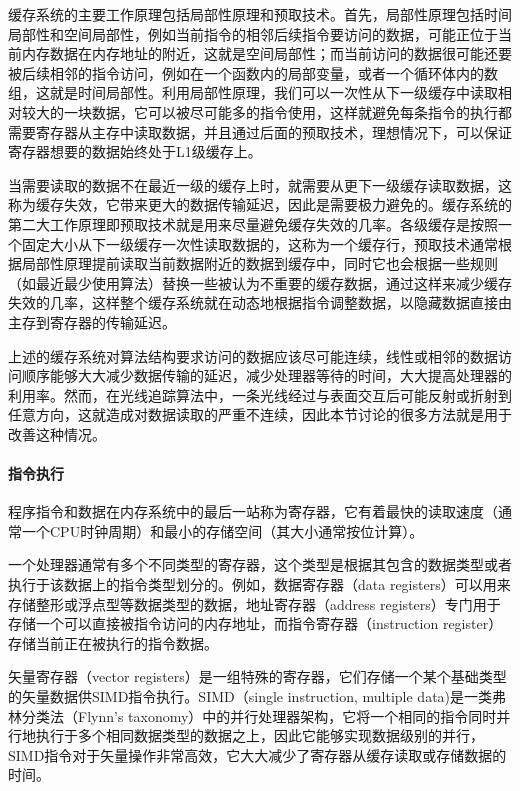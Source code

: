 缓存系统的主要工作原理包括局部性原理和预取技术。首先，局部性原理包括时间局部性和空间局部性，例如当前指令的相邻后续指令要访问的数据，可能正位于当前内存数据在内存地址的附近，这就是空间局部性；而当前访问的数据很可能还要被后续相邻的指令访问，例如在一个函数内的局部变量，或者一个循环体内的数组，这就是时间局部性。利用局部性原理，我们可以一次性从下一级缓存中读取相对较大的一块数据，它可以被尽可能多的指令使用，这样就避免每条指令的执行都需要寄存器从主存中读取数据，并且通过后面的预取技术，理想情况下，可以保证寄存器想要的数据始终处于L1级缓存上。

当需要读取的数据不在最近一级的缓存上时，就需要从更下一级缓存读取数据，这称为缓存失效，它带来更大的数据传输延迟，因此是需要极力避免的。缓存系统的第二大工作原理即预取技术就是用来尽量避免缓存失效的几率。各级缓存是按照一个固定大小从下一级缓存一次性读取数据的，这称为一个缓存行，预取技术通常根据局部性原理提前读取当前数据附近的数据到缓存中，同时它也会根据一些规则（如最近最少使用算法）替换一些被认为不重要的缓存数据，通过这样来减少缓存失效的几率，这样整个缓存系统就在动态地根据指令调整数据，以隐藏数据直接由主存到寄存器的传输延迟。

上述的缓存系统对算法结构要求访问的数据应该尽可能连续，线性或相邻的数据访问顺序能够大大减少数据传输的延迟，减少处理器等待的时间，大大提高处理器的利用率。然而，在光线追踪算法中，一条光线经过与表面交互后可能反射或折射到任意方向，这就造成对数据读取的严重不连续，因此本节讨论的很多方法就是用于改善这种情况。





\paragraph{指令执行}
程序指令和数据在内存系统中的最后一站称为寄存器，它有着最快的读取速度（通常一个CPU时钟周期）和最小的存储空间（其大小通常按位计算）。

一个处理器通常有多个不同类型的寄存器，这个类型是根据其包含的数据类型或者执行于该数据上的指令类型划分的。例如，数据寄存器（data registers）可以用来存储整形或浮点型等数据类型的数据，地址寄存器（address registers）专门用于存储一个可以直接被指令访问的内存地址，而指令寄存器（instruction register）存储当前正在被执行的指令数据。

矢量寄存器（vector registers）是一组特殊的寄存器，它们存储一个某个基础类型的矢量数据供SIMD指令执行。SIMD（single instruction, multiple data)是一类弗林分类法（Flynn's taxonomy）中的并行处理器架构，它将一个相同的指令同时并行地执行于多个相同数据类型的数据之上，因此它能够实现数据级别的并行，SIMD指令对于矢量操作非常高效，它大大减少了寄存器从缓存读取或存储数据的时间。

